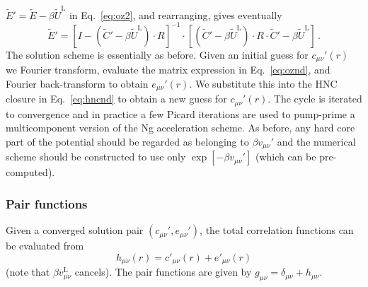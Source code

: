 \documentclass[12pt,a4paper]{article}
\newcommand{\lr}{^{\mathrm{L}}}
\newcommand{\Eqref}[1]{Eq.~\eqref{#1}}
\begin{document}
${\tilde E}'={\tilde E}-\beta{\tilde U}\lr$ in \Eqref{eq:oz2}, and
rearranging, gives eventually
%
\begin{equation}
{\tilde E}'=[I-({\tilde C}'-\beta{\tilde U}\lr)\cdot R]^{-1}\cdot
[({\tilde C}'-\beta{\tilde U}\lr)\cdot R\cdot {\tilde C}'-\beta{\tilde
    U}\lr]\,.
\label{eq:oznd}
\end{equation}
%
The solution scheme is essentially as before.  Given an initial guess
for $c_{\mu\nu}'(r)$ we Fourier transform, evaluate the matrix
expression in \Eqref{eq:oznd}, and Fourier back-transform to obtain
$e_{\mu\nu}'(r)$.  We substitute this into the HNC closure in
\Eqref{eq:hncnd} to obtain a new guess for $c_{\mu\nu}'(r)$.  The
cycle is iterated to convergence and in practice a few Picard
iterations are used to pump-prime a multicomponent version of the Ng
acceleration scheme.  As before, any hard core part of the potential
should be regarded as belonging to $\beta v_{\mu\nu}'$ and the
numerical scheme should be constructed to use only $\exp[-\beta
  v_{\mu\nu}']$ (which can be pre-computed).

\subsubsection{Pair functions}
%
Given a converged solution pair $(c_{\mu\nu}', e_{\mu\nu}')$, the
total correlation functions can be evaluated from
%
\begin{equation}
h_{\mu\nu}(r) = c'_{\mu\nu}(r) +  e'_{\mu\nu}(r)\label{eq:hrs}
\end{equation}
%
(note that $\beta v_{\mu\nu}\lr$ cancels).  The pair functions are
given by $g_{\mu\nu}=\delta_{\mu\nu}+h_{\mu\nu}$.
\end{document}
